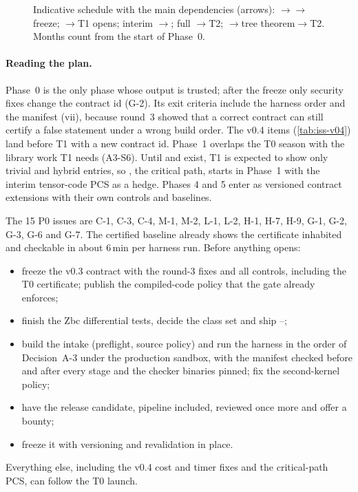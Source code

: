 \begin{figure}[t]
\caption{Indicative schedule with the main dependencies (arrows): $\to$$\to$freeze; $\to$T1 opens; interim $\to$; full $\to$T2;
$\to$tree theorem$\to$T2. Months count from the start of Phase~0.}
\label{fig:iss-gantt}
\end{figure}

\paragraph{Reading the plan.} Phase~0 is the only phase whose output is trusted; after the freeze
only security fixes change the contract id (G-2). Its exit criteria include the harness order and the
manifest (vii), because round~3 showed that a correct contract can still certify a false statement
under a wrong build order. The v0.4 items (\cref{tab:iss-v04}) land before T1 with a new
contract id. Phase~1 overlaps the T0 season with the library work T1 needs (A3-S6). Until  and
 exist, T1 is expected to show only trivial and hybrid entries, so , the critical path,
starts in Phase~1 with the interim tensor-code PCS as a hedge. Phases 4 and 5 enter as versioned
contract extensions with their own controls and baselines.

\FloatBarrier
\begin{takeaway}
The 15 P0 issues are C-1, C-3, C-4, M-1, M-2, L-1, L-2, H-1, H-7, H-9, G-1, G-2, G-3, G-6 and G-7.
The certified baseline already shows the certificate inhabited and checkable in about 6\,min per
harness run. Before anything opens:
\begin{itemize}[nosep]
\item freeze the v0.3 contract with the round-3 fixes and all controls, including the T0
  certificate; publish the compiled-code policy that the gate already enforces;
\item finish the Zbc differential tests, decide the class set and ship --;
\item build the intake (preflight, source policy) and run the harness in the order of Decision~A-3
  under the production sandbox, with the  manifest checked before and after every stage
  and the checker binaries pinned; fix the second-kernel policy;
\item have the release candidate, pipeline included, reviewed once more and offer a bounty;
\item freeze it with versioning and revalidation in place.
\end{itemize}
Everything else, including the v0.4 cost and timer fixes and the critical-path PCS, can follow the T0
launch.
\end{takeaway}
\clearpage
